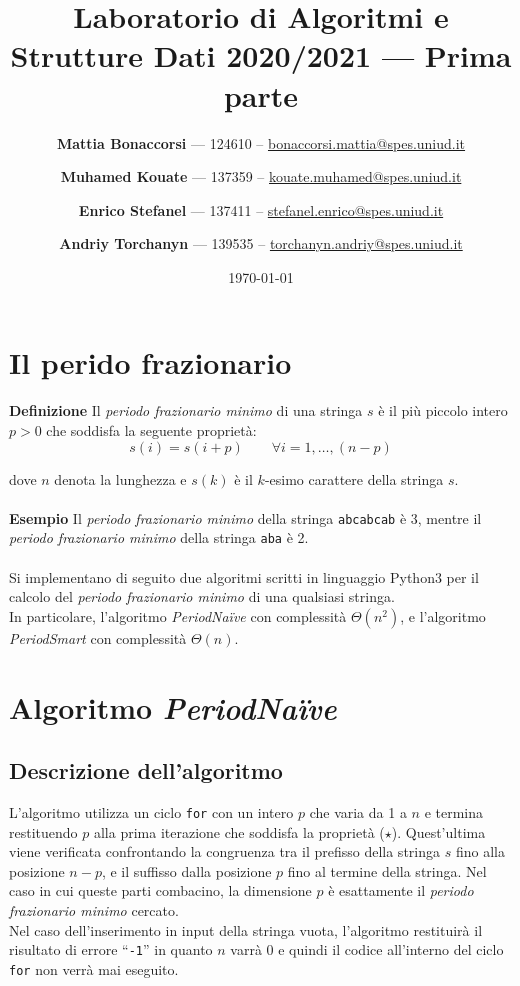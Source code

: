 \documentclass[11pt,a4paper,italian]{article}
\title{\textbf{Laboratorio di Algoritmi e Strutture Dati 2020/2021} --- Prima parte}
\date{\today}
\author{\textbf{Mattia Bonaccorsi} --- 124610 -- \href{mailto:bonaccorsi.mattia@spes.uniud.it}{bonaccorsi.mattia@spes.uniud.it}
   \and \textbf{Muhamed Kouate} --- 137359 -- \href{mailto:kouate.muhamed@spes.uniud.it}{kouate.muhamed@spes.uniud.it}
   \and \textbf{Enrico Stefanel} --- 137411 -- \href{mailto:stefanel.enrico@spes.uniud.it}{stefanel.enrico@spes.uniud.it}
   \and \textbf{Andriy Torchanyn} --- 139535 -- \href{mailto:torchanyn.andriy@spes.uniud.it}{torchanyn.andriy@spes.uniud.it}
   }
\begin{document}
\maketitle

\section{Il perido frazionario}
\textbf{Definizione} Il \textit{periodo frazionario minimo} di una stringa $s$ è il più piccolo intero $p>0$ che soddisfa la seguente
proprietà:
\begin{equation}
s(i) = s(i+p)\qquad \forall i = 1, \dots , (n-p) \tag{$\star$}
\end{equation}

dove $n$ denota la lunghezza e $s(k)$ è il $k$-esimo carattere della stringa $s$.\\
\\
\textbf{Esempio} Il \emph{periodo frazionario minimo} della stringa \texttt{abcabcab} è 3, mentre il \emph{periodo frazionario minimo} della stringa \texttt{aba} è 2.\\
\\
Si implementano di seguito due algoritmi scritti in linguaggio Python3 per il calcolo del \emph{periodo frazionario minimo} di una qualsiasi stringa.\\
In particolare, l'algoritmo \textit{PeriodNa{\"i}ve} con complessità $\Theta(n^2)$, e l'algoritmo \textit{PeriodSmart} con complessità $\Theta(n)$.



\section{Algoritmo \textit{PeriodNa{\"i}ve}}

\subsection{Descrizione dell'algoritmo}
L'algoritmo utilizza un ciclo \texttt{for}  con un intero $p$ che varia da 1 a $n$ e termina restituendo $p$ alla prima iterazione che soddisfa la proprietà ($\star$). Quest'ultima viene verificata confrontando la congruenza tra il prefisso della stringa $s$ fino alla posizione $n-p$, e il suffisso dalla posizione $p$ fino al termine della stringa. Nel caso in cui queste parti combacino, la dimensione $p$ è esattamente il \textit{periodo frazionario minimo} cercato.\\
Nel caso dell'inserimento in input della stringa vuota, l'algoritmo restituirà il risultato di errore ``\texttt{-1}'' in quanto $n$ varrà 0 e quindi il codice all'interno del ciclo \texttt{for} non verrà mai eseguito.
\end{document}
